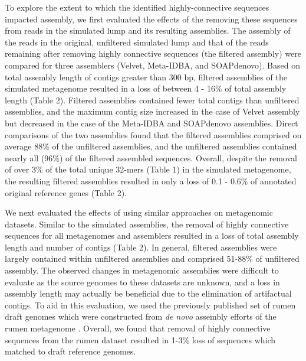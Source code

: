 \documentclass[10pt]{article}
\begin{document}
To explore the extent to which the identified highly-connective sequences impacted assembly, we first evaluated the effects of the removing these sequences from reads in the simulated lump and its resulting assemblies.  The assembly of the reads in the original, unfiltered simulated lump and that of the reads remaining after removing highly connective sequences (the filtered assembly) were compared for three assemblers (Velvet, Meta-IDBA, and SOAPdenovo).  Based on total assembly length of contigs greater than 300 bp, filtered assemblies of the simulated metagenome resulted in a loss of between 4 - 16\% of total assembly length (Table 2).   Filtered assemblies contained fewer total contigs than unfiltered assemblies, and the maximum contig size increased in the case of Velvet assembly but decreased in the case of the Meta-IDBA and SOAPdenovo assemblies.  Direct comparisons of the two assemblies found that the filtered assemblies comprised on average 88\% of the unfiltered assemblies, and the unfiltered assemblies contained nearly all (96\%) of the filtered assembled sequences.  Overall, despite the removal of over 3\% of the total unique 32-mers (Table 1) in the simulated metagenome, the resulting filtered assemblies resulted in only a loss of 0.1 - 0.6\% of annotated original reference genes (Table 2). 

We next evaluated the effects of using similar approaches on metagenomic datasets.  Similar to the simulated assemblies, the removal of highly connective sequences for all metagenomes and assemblers resulted in a loss of total assembly length and number of contigs (Table 2).  In general, filtered assemblies were largely contained within unfiltered assemblies and comprised 51-88\% of unfiltered assembly.   The observed changes in metagenomic assemblies were difficult to evaluate as the source genomes to these datasets are unknown, and a loss in assembly length may actually be beneficial due to the elimination of artifactual contigs.  To aid in this evaluation, we used the previously published set of rumen draft genomes which were constructed from \emph{de novo} assembly efforts of the rumen metagenome \cite{Hess:2011p686}.  Overall, we found that removal of highly connective sequences from the rumen dataset resulted in 1-3\% loss of sequences which matched to draft reference genomes.  
\end{document}
